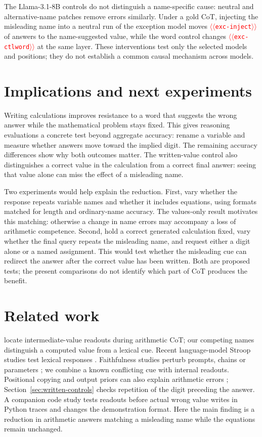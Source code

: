 \documentclass[11pt]{article}
\providecommand{\NUM}[1]{\textcolor{red}{$\langle\langle$\texttt{#1}$\rangle\rangle$}}
\begin{document}
The Llama-3.1-8B controls do not distinguish a name-specific cause: neutral and alternative-name
patches remove errors similarly. Under a gold CoT, injecting the misleading name into a neutral
run of the exception model moves \NUM{exc-inject} of answers to the name-suggested value, while the word control
changes \NUM{exc-ctlword} at the same layer. These interventions test only the selected models and positions; they do not establish a common causal mechanism across models.



\section{Implications and next experiments}

Writing calculations improves resistance to a word that suggests the wrong answer while
the mathematical problem stays fixed. This gives reasoning evaluations a concrete test
beyond aggregate accuracy: rename a variable and measure whether answers move toward
the implied digit. The remaining accuracy differences show why both outcomes matter.
The written-value control also distinguishes a correct value in the calculation from
a correct final answer: seeing that value alone can miss the effect of a misleading name.

Two experiments would help explain the reduction. First, vary whether the response
repeats variable names and whether it includes equations, using formats matched for
length and ordinary-name accuracy. The values-only result motivates this matching:
otherwise a change in name errors may accompany a loss of arithmetic competence.
Second, hold a correct generated calculation fixed, vary whether the final query repeats
the misleading name, and request either a digit alone or a named assignment. This would
test whether the misleading cue can redirect the answer after the correct value has
been written. Both are proposed
tests; the present comparisons do not identify which part of CoT produces the benefit.

\section{Related work}

\citet{kudo2026faithful} locate intermediate-value readouts during arithmetic CoT; our competing
names distinguish a computed value from a lexical cue. Recent language-model Stroop studies
test lexical responses \cite{wang2026stroop,hu2026conflict}. Faithfulness studies perturb prompts, chains or
parameters \cite{turpin2023unfaithful,lanham2023measuring,chen2025reasoning,tutek2025unlearning};
we combine a known conflicting cue with internal readouts. Positional copying and output priors
can also explain arithmetic errors \cite{liu2026readout,prabhakar2024deciphering};
Section~\ref{sec:written-controls} checks repetition of the digit preceding the answer.
A companion code study \citep{anon2026code} tests readouts before actual wrong value writes
in Python traces and changes the demonstration format. Here the main finding is a reduction
in arithmetic answers matching a misleading name while the equations remain unchanged.
\end{document}
